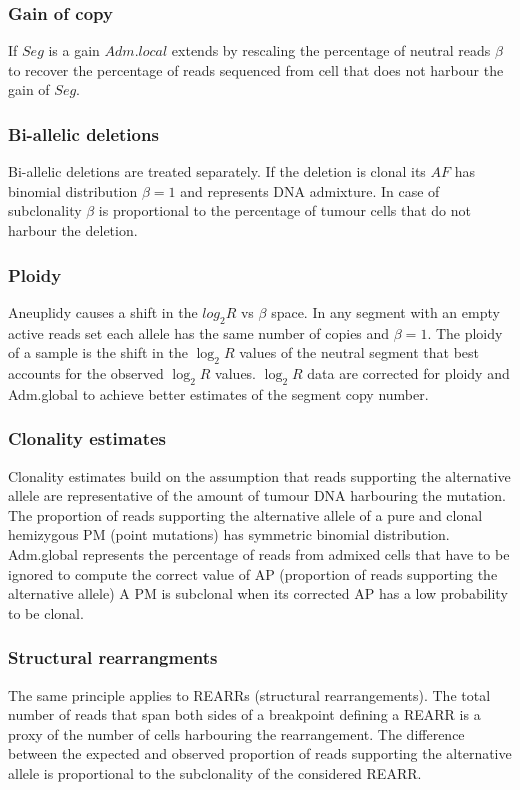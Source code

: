 		\subsubsection{Gain of copy}
		If $Seg$ is a gain $Adm.local$ extends by rescaling the percentage of neutral reads $\beta$ to recover the percentage of reads sequenced from cell that does not harbour the gain of $Seg$.

		\subsubsection{Bi-allelic deletions}
		Bi-allelic deletions are treated separately.
		If the deletion is clonal its $AF$ has binomial distribution $\beta=1$ and represents DNA admixture.
		In case of subclonality $\beta$ is proportional to the percentage of tumour cells that do not harbour the deletion.

		\subsubsection{Ploidy}
		Aneuplidy causes a shift in the $log_2 R$ vs $\beta$ space.
		In any segment with an empty active reads set each allele has the same number of copies and $\beta=1$.
		The ploidy of a sample is the shift in the $\log_2 R$ values of the neutral segment that best accounts for the observed $\log_2 R$ values.
		$\log_2 R$ data are corrected for ploidy and Adm.global to achieve better estimates of the segment copy number.

		\subsubsection{Clonality estimates}
		Clonality estimates build on the assumption that reads supporting the alternative allele are representative of the amount of tumour DNA harbouring the mutation.
		The proportion of reads supporting the alternative allele of a pure and clonal hemizygous PM (point mutations) has symmetric binomial distribution.
		Adm.global represents the percentage of reads from admixed cells that have to be ignored to compute the correct value of AP (proportion of reads supporting the alternative allele)
		A PM is subclonal when its corrected AP has a low probability to be clonal.

		\subsubsection{Structural rearrangments}
		The same principle applies to REARRs (structural rearrangements).
		The total number of reads that span both sides of a breakpoint defining a REARR is a proxy of the number of cells harbouring the rearrangement.
		The difference between the expected and observed proportion of reads supporting the alternative allele is proportional  to the subclonality of the considered REARR.


